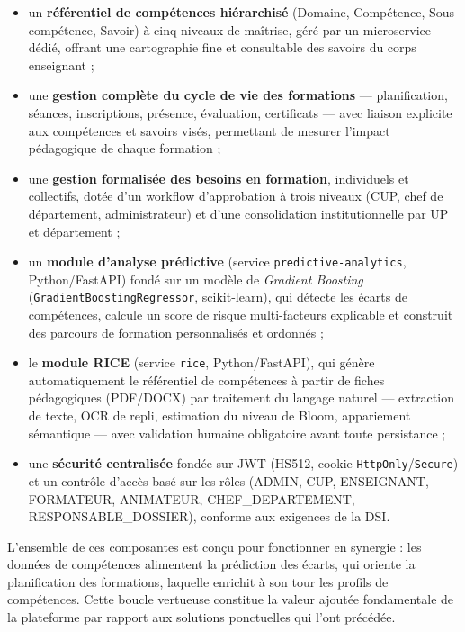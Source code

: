 \documentclass[12pt,a4paper]{report}
\begin{document}
\begin{itemize}[leftmargin=1.2cm]
  \item un \textbf{référentiel de compétences hiérarchisé} (Domaine,
  Compétence, Sous-compétence, Savoir) à cinq niveaux de maîtrise, géré par un
  microservice dédié, offrant une cartographie fine et consultable des savoirs
  du corps enseignant ;

  \item une \textbf{gestion complète du cycle de vie des formations} —
  planification, séances, inscriptions, présence, évaluation, certificats — avec
  liaison explicite aux compétences et savoirs visés, permettant de mesurer
  l'impact pédagogique de chaque formation ;

  \item une \textbf{gestion formalisée des besoins en formation}, individuels et
  collectifs, dotée d'un workflow d'approbation à trois niveaux (CUP, chef de
  département, administrateur) et d'une consolidation institutionnelle par UP
  et département ;

  \item un \textbf{module d'analyse prédictive} (service \texttt{predictive-analytics},
  Python/FastAPI) fondé sur un modèle de \textit{Gradient Boosting}
  (\texttt{GradientBoostingRegressor}, scikit-learn), qui détecte les écarts de
  compétences, calcule un score de risque multi-facteurs explicable et construit
  des parcours de formation personnalisés et ordonnés ;

  \item le \textbf{module RICE} (service \texttt{rice}, Python/FastAPI), qui
  génère automatiquement le référentiel de compétences à partir de fiches
  pédagogiques (PDF/DOCX) par traitement du langage naturel — extraction de
  texte, OCR de repli, estimation du niveau de Bloom, appariement sémantique —
  avec validation humaine obligatoire avant toute persistance ;

  \item une \textbf{sécurité centralisée} fondée sur JWT (HS512, cookie
  \texttt{HttpOnly}/\texttt{Secure}) et un contrôle d'accès basé sur les rôles
  (ADMIN, CUP, ENSEIGNANT, FORMATEUR, ANIMATEUR, CHEF\_DEPARTEMENT,
  RESPONSABLE\_DOSSIER), conforme aux exigences de la DSI.
\end{itemize}

L'ensemble de ces composantes est conçu pour fonctionner en synergie :
les données de compétences alimentent la prédiction des écarts, qui oriente la
planification des formations, laquelle enrichit à son tour les profils de
compétences. Cette boucle vertueuse constitue la valeur ajoutée fondamentale de
la plateforme par rapport aux solutions ponctuelles qui l'ont précédée.
\end{document}
